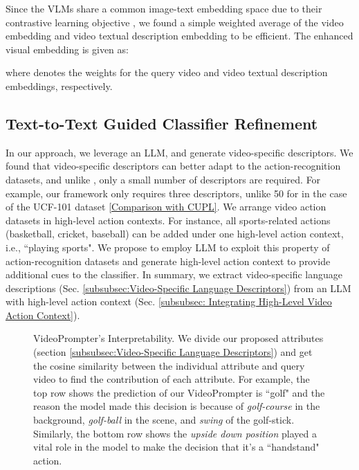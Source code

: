 \documentclass{article} \usepackage{iclr2024_conference,times}
\begin{document}
Since the VLMs share a common image-text embedding space due to their contrastive learning objective \citep{radford2021learning}, we found a simple weighted average of the video embedding and video textual description embedding to be efficient. The enhanced visual embedding  is given as:




where  denotes the weights for the query video and video textual description embeddings, respectively.  




\subsection{Text-to-Text Guided Classifier Refinement}


In our approach, we leverage an LLM, \citep{brown2020language} and generate video-specific descriptors. We found that video-specific descriptors can better adapt to the action-recognition datasets, and unlike \citep{pratt2022does}, only a small number of descriptors are required. For example, our framework only requires three descriptors, unlike 50 for \citep{pratt2022does} in the case of the UCF-101 dataset \citep{soomro2012ucf101} \ref{Comparison with CUPL}.
We arrange video action datasets in high-level action contexts.
For instance, all sports-related actions (basketball, cricket, baseball) can be added under one high-level action context, i.e., ``playing sports". We propose to employ LLM to exploit this property of action-recognition datasets and generate high-level action context to provide additional cues to the classifier. In summary, we extract video-specific language descriptions (Sec. \ref{subsubsec:Video-Specific Language Descriptors}) from an LLM with high-level action context (Sec. \ref{subsubsec: Integrating High-Level Video Action Context}). 

\begin{figure}[!t]
\caption{VideoPrompter's Interpretability. We divide our proposed attributes (section \ref{subsubsec:Video-Specific Language Descriptors}) and get the cosine similarity between the individual attribute and query video to find the contribution of each attribute. For example, the top row shows the prediction of our VideoPrompter is ``golf" and the reason the model made this decision is because of \emph{golf-course} in the background, \emph{golf-ball} in the scene, and \emph{swing} of the golf-stick. Similarly, the bottom row shows the \emph{upside down position} played a vital role in the model to make the decision that it's a ``handstand" action.}
    \label{fig:VideoPromper's Interoperability}
    \vspace{-1em}
\end{figure}
\end{document}
